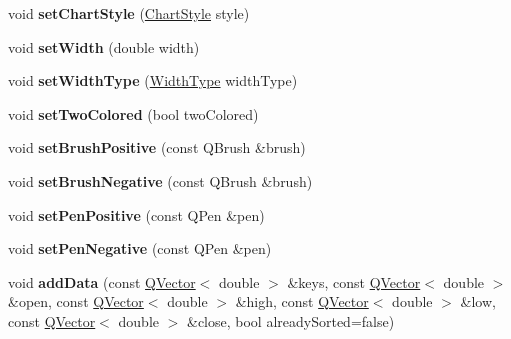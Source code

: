\begin{DoxyCompactItemize}
\item 
void {\bfseries set\+Chart\+Style} (\hyperlink{class_q_c_p_financial_a0f800e21ee98d646dfc6f8f89d10ebfb}{Chart\+Style} style)\hypertarget{class_q_c_p_financial_a5a59175d36279d71596e64d7bb65596f}{}\label{class_q_c_p_financial_a5a59175d36279d71596e64d7bb65596f}

\item 
void {\bfseries set\+Width} (double width)\hypertarget{class_q_c_p_financial_a99633f8bac86a61d534ae5eeb1a3068f}{}\label{class_q_c_p_financial_a99633f8bac86a61d534ae5eeb1a3068f}

\item 
void {\bfseries set\+Width\+Type} (\hyperlink{class_q_c_p_financial_aef1761dda71a53dc5269685e9e492626}{Width\+Type} width\+Type)\hypertarget{class_q_c_p_financial_a204b7b710352796593a432b723e34089}{}\label{class_q_c_p_financial_a204b7b710352796593a432b723e34089}

\item 
void {\bfseries set\+Two\+Colored} (bool two\+Colored)\hypertarget{class_q_c_p_financial_a138e44aac160a17a9676652e240c5f08}{}\label{class_q_c_p_financial_a138e44aac160a17a9676652e240c5f08}

\item 
void {\bfseries set\+Brush\+Positive} (const Q\+Brush \&brush)\hypertarget{class_q_c_p_financial_a5ebff2b1764efd07cc44942e67821829}{}\label{class_q_c_p_financial_a5ebff2b1764efd07cc44942e67821829}

\item 
void {\bfseries set\+Brush\+Negative} (const Q\+Brush \&brush)\hypertarget{class_q_c_p_financial_a8bbdd87629f9144b3ef51af660c0961a}{}\label{class_q_c_p_financial_a8bbdd87629f9144b3ef51af660c0961a}

\item 
void {\bfseries set\+Pen\+Positive} (const Q\+Pen \&pen)\hypertarget{class_q_c_p_financial_ac58aa3adc7a35aab0088764b840683e5}{}\label{class_q_c_p_financial_ac58aa3adc7a35aab0088764b840683e5}

\item 
void {\bfseries set\+Pen\+Negative} (const Q\+Pen \&pen)\hypertarget{class_q_c_p_financial_afe5c07e94ccea01a75b3a2476993c346}{}\label{class_q_c_p_financial_afe5c07e94ccea01a75b3a2476993c346}

\item 
void {\bfseries add\+Data} (const \hyperlink{class_q_vector}{Q\+Vector}$<$ double $>$ \&keys, const \hyperlink{class_q_vector}{Q\+Vector}$<$ double $>$ \&open, const \hyperlink{class_q_vector}{Q\+Vector}$<$ double $>$ \&high, const \hyperlink{class_q_vector}{Q\+Vector}$<$ double $>$ \&low, const \hyperlink{class_q_vector}{Q\+Vector}$<$ double $>$ \&close, bool already\+Sorted=false)\hypertarget{class_q_c_p_financial_a372ac031e44a7a6c912d203556af96f7}{}\label{class_q_c_p_financial_a372ac031e44a7a6c912d203556af96f7}


\end{DoxyCompactItemize}
